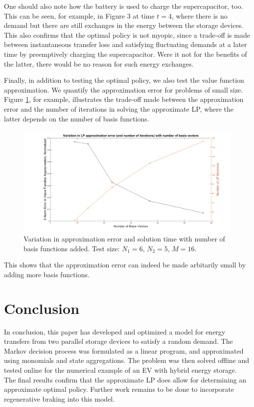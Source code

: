 \documentclass[conference]{IEEEtran}
\begin{document}
One should also note how the battery is used to charge the supercapacitor, too. This can be seen, for example, in Figure 3 at time $t=4$, where there is no demand but there are still exchanges in the energy between the storage devices. This also confirms that the optimal policy is not myopic, since a trade-off is made between instantaneous transfer loss and satisfying fluctuating demands at a later time by preemptively charging the supercapacitor. Were it not for the benefits of the latter, there would be no reason for such energy exchanges.

Finally, in addition to testing the optimal policy, we also test the value function approximation. We quantify the approximation error for problems of small size. Figure \ref{fig:ApproxVsIter}, for example, illustrates the trade-off made between the approximation error and the number of iterations in solving the approximate LP, where the latter depends on the number of basis functions. \begin{figure}[tbp]
\centerline{\includegraphics[scale=0.25]{ApproxErr_vs_NumIter.png}}
\caption{Variation in approximation error and solution time with number of basis functions added. Test size: $N_{1}=6$, $N_{2}=5$, $M=16$.}
\label{fig:ApproxVsIter}
\end{figure} This shows that the approximation error can indeed be made arbitarily small by adding more basis functions. %



\section{Conclusion}
In conclusion, this paper has developed and optimized a model for energy transfers from two parallel storage devices to satisfy a random demand. The Markov decision process was formulated as a linear program, and approximated using monomials and state aggregations. The problem was then solved offline and tested online for the numerical example of an EV with hybrid energy storage. The final results confirm that the approximate LP does allow for determining an approximate optimal policy. Further work remains to be done to incorporate regenerative braking into this model.



\end{document}
